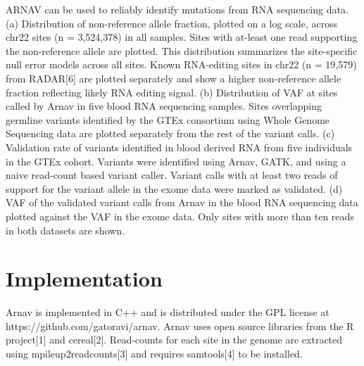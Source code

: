 ARNAV can be used to reliably identify mutations from RNA sequencing data. (a) Distribution of non-reference allele fraction, plotted on a log scale, across chr22 sites (n = 3,524,378) in all samples. Sites with at-least one read supporting the non-reference allele are plotted. This distribution summarizes the site-specific null error models across all sites. Known RNA-editing sites in chr22 (n = 19,579) from RADAR[6] are plotted separately and show a higher non-reference allele fraction reflecting likely RNA editing signal. (b) Distribution of VAF at sites called by Arnav in five blood RNA sequencing samples. Sites overlapping germline variants identified by the GTEx consortium using Whole Genome Sequencing data are plotted separately from the rest of the variant calls. (c) Validation rate of variants identified in blood derived RNA from five individuals in the GTEx cohort. Variants were identified using Arnav, GATK, and using a naive read-count based variant caller. Variant calls with at least two reads of support for the variant allele in the exome data were marked as validated. (d) VAF of the validated variant calls from Arnav in the blood RNA sequencing data plotted against the VAF in the exome data. Only sites with more than ten reads in both datasets are shown.

\section{Implementation}
Arnav is implemented in C++ and is distributed under the GPL license at https://github.com/gatoravi/arnav. Arnav uses open source libraries from the R project[1] and cereal[2]. Read-counts for each site in the genome are extracted using mpileup2readcounts[3] and requires samtools[4] to be installed.


